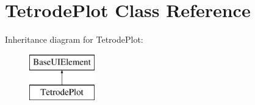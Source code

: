 \hypertarget{classTetrodePlot}{\section{Tetrode\-Plot Class Reference}
\label{classTetrodePlot}
}
Inheritance diagram for Tetrode\-Plot\-:\begin{figure}[H]
\begin{center}
\leavevmode
\includegraphics[height=2.000000cm]{classTetrodePlot}
\end{center}
\end{figure}
